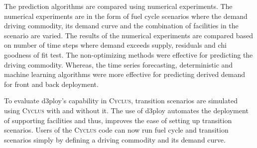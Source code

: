 \documentclass{anstrans}
\newcommand{\Cyclus}{\textsc{Cyclus}\xspace}%
\begin{document}
The prediction algorithms are compared using numerical experiments. 
The numerical experiments are in the form of fuel cycle scenarios where the
demand driving commodity, its demand curve and the combination of facilities 
in the scenario are varied. 
The results of the numerical experiments are compared based on number of time
steps where demand exceeds supply, residuals and chi goodness of fit test. 
The non-optimizing methods were effective for predicting the driving commodity.
Whereas, the time series forecasting, deterministic and machine learning 
algorithms were more effective for predicting derived demand for front and 
back deployment. 

To evaluate d3ploy's capability in \Cyclus, transition scenarios 
are simulated using \Cyclus with and without it. 
The use of d3ploy automates the deployment of supporting facilities and thus, 
improves the ease of setting up transition scenarios. 
Users of the \Cyclus code can now run fuel cycle and transition scenarios simply 
by defining a driving commodity and its demand curve. 



\end{document}
